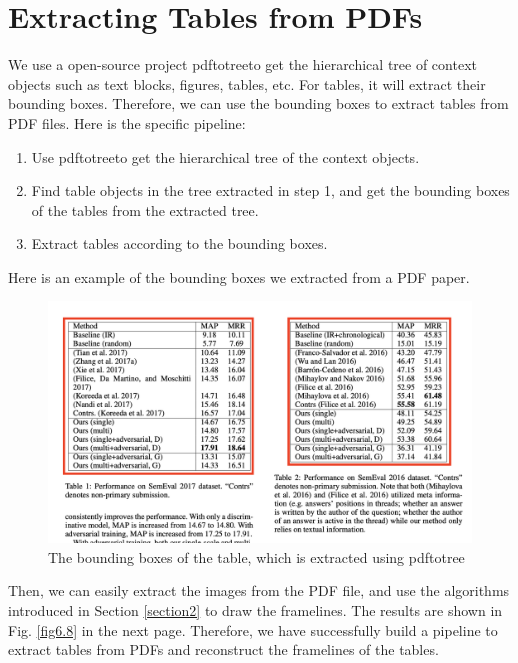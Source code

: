 \documentclass[12pt, a4paper]{article}
\theoremstyle{definition}
\begin{document}
\section{Extracting Tables from PDFs}
We use a open-source project pdftotree\footnotemark[1] to
get the hierarchical tree of context objects such as text blocks, figures, tables, etc. For tables, it will extract their bounding boxes. Therefore, we can use the bounding boxes to extract tables from PDF files. Here is the specific pipeline:
\begin{enumerate}
\item Use pdftotree\footnotemark[1] to get the hierarchical tree of the context objects.
\item Find table objects in the tree extracted in step 1, and get the bounding boxes of the tables from the extracted tree.
\item Extract tables according to the bounding boxes.
\end{enumerate}

Here is an example of the bounding boxes we extracted from a PDF paper\footnotemark[2].

\begin{figure}[htbp]
	\centering
	\includegraphics[width=0.9\linewidth]{table-bounding-boxes.png}
	\caption{The bounding boxes of the table, which is extracted using pdftotree}
	\label{fig6.5}
\end{figure}

Then, we can easily extract the images from the PDF file, and use the algorithms introduced in Section \ref{section2} to draw the framelines. The results are shown in Fig. \ref{fig6.8} in the next page. Therefore, we have successfully build a pipeline to extract tables from PDFs and reconstruct the framelines of the tables.
\end{document}
